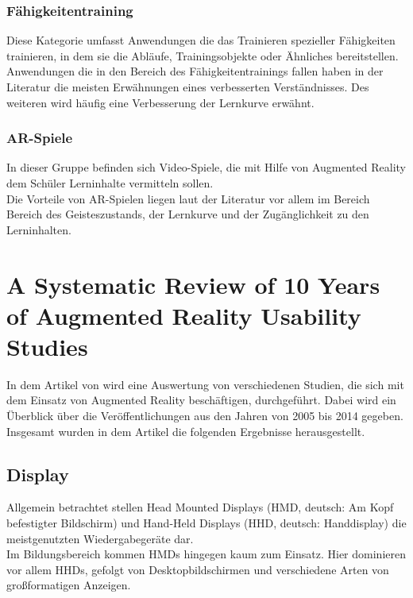 \subsubsection{Fähigkeitentraining}
Diese Kategorie umfasst Anwendungen die das Trainieren spezieller Fähigkeiten trainieren, in dem sie die Abläufe, Trainingsobjekte oder Ähnliches bereitstellen. \citep[Kapitel 2.2]{diegmann:benefits-ar} \\
Anwendungen die in den Bereich des Fähigkeitentrainings fallen haben in der Literatur die meisten Erwähnungen eines verbesserten Verständnisses. Des weiteren wird häufig eine Verbesserung der Lernkurve erwähnt. \citep[Kapitel 5]{diegmann:benefits-ar}

\subsubsection{AR-Spiele}
In dieser Gruppe befinden sich Video-Spiele, die mit Hilfe von Augmented Reality dem Schüler Lerninhalte vermitteln sollen. \citep[Kapitel 2.2]{diegmann:benefits-ar} \\
Die Vorteile von AR-Spielen liegen laut der Literatur vor allem im Bereich Bereich des Geisteszustands, der Lernkurve und der Zugänglichkeit zu den Lerninhalten. \citep[Kapitel 5]{diegmann:benefits-ar}



\section{A Systematic Review of 10 Years of Augmented Reality Usability Studies}
In dem Artikel \citep{dey:review-of-ar-studies} von \citeauthor{dey:review-of-ar-studies} wird eine Auswertung von verschiedenen Studien, die sich mit dem Einsatz von Augmented Reality beschäftigen, durchgeführt. Dabei wird ein Überblick über die Veröffentlichungen aus den Jahren von 2005 bis 2014 gegeben.\\
Insgesamt wurden in dem Artikel die folgenden Ergebnisse herausgestellt.

\subsection{Display}
Allgemein betrachtet stellen Head Mounted Displays (HMD, deutsch: \glqq Am Kopf befestigter Bildschirm\grqq ) und Hand-Held Displays (HHD, deutsch: \glqq Handdisplay\grqq ) die meistgenutzten Wiedergabegeräte dar.\\
Im Bildungsbereich kommen HMDs hingegen kaum zum Einsatz. Hier dominieren vor allem HHDs, gefolgt von Desktopbildschirmen und  verschiedene Arten von großformatigen Anzeigen. \citep[Kapitel 3.7]{dey:review-of-ar-studies}

